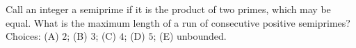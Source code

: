 Call an integer a semiprime if it is the product of two primes, which may be equal. What is the maximum length of a run of consecutive positive semiprimes? Choices: (A) $2$; (B) $3$; (C) $4$; (D) $5$; (E) unbounded.
